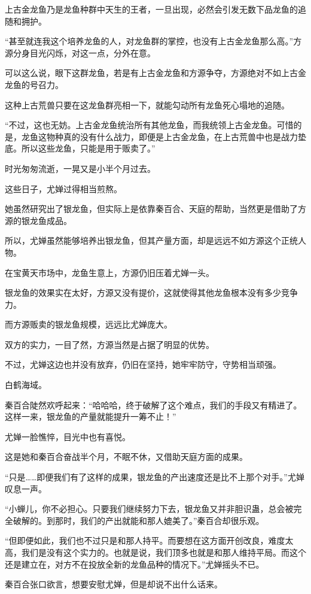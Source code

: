 \begin{this_body}
上古金龙鱼乃是龙鱼种群中天生的王者，一旦出现，必然会引发无数下品龙鱼的追随和拥护。

“甚至就连我这个培养龙鱼的人，对龙鱼群的掌控，也没有上古金龙鱼那么高。”方源分身目光闪烁，对这一点，分外在意。

可以这么说，眼下这群龙鱼，若是有上古金龙鱼和方源争夺，方源绝对不如上古金龙鱼的号召力。

这种上古荒兽只要在这龙鱼群亮相一下，就能勾动所有龙鱼死心塌地的追随。

“不过，这也无妨。上古金龙鱼统治所有其他龙鱼，而我统领上古金龙鱼。可惜的是，龙鱼这物种真的没有什么战力，即便是上古金龙鱼，在上古荒兽中也是战力垫底。所以这些龙鱼，只能是用于贩卖了。”

时光匆匆流逝，一晃又是小半个月过去。

这些日子，尤婵过得相当煎熬。

她虽然研究出了银龙鱼，但实际上是依靠秦百合、天庭的帮助，当然更是借助了方源的银龙鱼成品。

所以，尤婵虽然能够培养出银龙鱼，但其产量方面，却是远远不如方源这个正统人物。

在宝黄天市场中，龙鱼生意上，方源仍旧压着尤婵一头。

银龙鱼的效果实在太好，方源又没有提价，这就使得其他龙鱼根本没有多少竞争力。

而方源贩卖的银龙鱼规模，远远比尤婵庞大。

双方的实力，一目了然，方源当然是占据了明显的优势。

不过，尤婵这边也并没有放弃，仍旧在坚持，她牢牢防守，守势相当顽强。

白鹤海域。

秦百合陡然欢呼起来：“哈哈哈，终于破解了这个难点，我们的手段又有精进了。这样一来，银龙鱼的产量就能提升一筹不止！”

尤婵一脸憔悴，目光中也有喜悦。

这是她和秦百合奋战半个月，不眠不休，又借助天庭方面的成果。

“只是……即便我们有了这样的成果，银龙鱼的产出速度还是比不上那个对手。”尤婵叹息一声。

“小蝉儿，你不必担心。只要我们继续努力下去，银龙鱼又并非胆识蛊，总会被完全破解的。到那时，我们的产出就能和那人媲美了。”秦百合却很乐观。

“但即便如此，我们也不过只是和那人持平。而要想在这方面开创改良，难度太高，我们是没有这个实力的。也就是说，我们顶多也就是和那人维持平局。而这个还是建立在，对方不在投放全新的龙鱼品种的情况下。”尤婵摇头不已。

秦百合张口欲言，想要安慰尤婵，但是却说不出什么话来。


\end{this_body}
